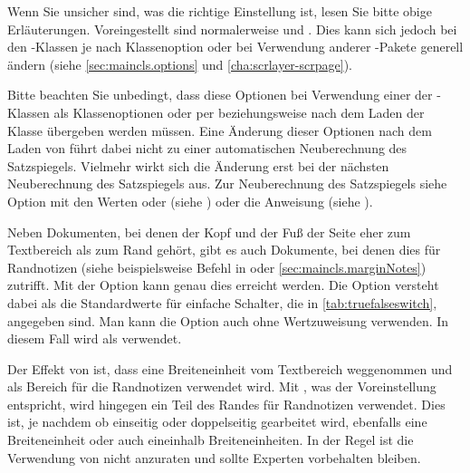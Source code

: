 Wenn Sie unsicher sind, was die richtige Einstellung ist, lesen Sie bitte
obige Erläuterungen. Voreingestellt sind normalerweise
 und
. Dies kann sich jedoch bei den
\KOMAScript-Klassen je nach Klassenoption oder bei Verwendung anderer
\KOMAScript-Pakete generell ändern (siehe \autoref{sec:maincls.options} und
\autoref{cha:scrlayer-scrpage}).

Bitte beachten Sie unbedingt, dass diese Optionen bei
Verwendung einer der \KOMAScript-Klassen als Klassenoptionen oder per
 beziehungsweise
 nach dem Laden der Klasse übergeben werden
müssen. Eine Änderung dieser Optionen nach dem Laden von 
führt dabei nicht zu einer
automatischen Neuberechnung des Satzspiegels. Vielmehr wirkt sich die Änderung
erst bei der nächsten Neuberechnung des Satzspiegels aus. Zur Neuberechnung
des Satzspiegels siehe Option
\hyperref[desc:\LabelBase.option.DIV.last]{} mit den Werten
\hyperref[desc:\LabelBase.option.DIV.last]{} oder
\hyperref[desc:\LabelBase.option.DIV.current]{} (siehe
) oder die Anweisung
 (siehe
).%
%
\EndIndexGroup

\begin{Declaration}
\end{Declaration}
Neben Dokumenten, bei denen der Kopf und der Fuß der Seite eher
zum Textbereich als zum Rand gehört, gibt es auch Dokumente, bei denen dies
für Randnotizen (siehe beispielsweise Befehl 
in \cite{l2kurz} oder \autoref{sec:maincls.marginNotes}) zutrifft. Mit der
Option  kann genau dies erreicht werden.  Die Option
versteht dabei als 
die Standardwerte für einfache Schalter, die in \autoref{tab:truefalseswitch},
 angegeben sind. Man kann die Option auch
ohne Wertzuweisung verwenden. In diesem Fall wird  als
 verwendet.

Der Effekt von
 ist,
dass eine Breiteneinheit vom Textbereich weggenommen und als Bereich für die
Randnotizen verwendet wird. Mit
, was
der Voreinstellung entspricht, wird hingegen ein Teil des Randes für
Randnotizen verwendet. Dies ist, je nachdem ob einseitig oder doppelseitig
gearbeitet wird, ebenfalls eine Breiteneinheit oder auch eineinhalb
Breiteneinheiten. In der Regel ist die Verwendung von
 nicht anzuraten und sollte Experten vorbehalten
bleiben.


